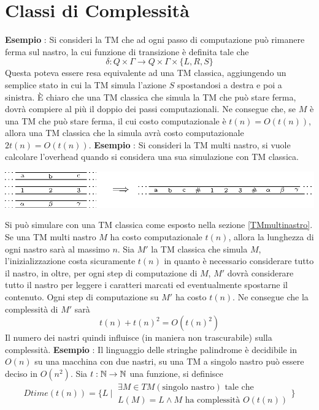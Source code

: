 \documentclass[10pt, letterpaper]{report}
\begin{document}
\section{Classi di Complessità}\label{classiComplessità}
\textbf{Esempio} : Si consideri la TM che ad ogni passo di computazione può rimanere ferma sul nastro, la cui funzione di transizione è definita tale che 
$$ \delta:Q\times\Gamma \rightarrow Q\times\Gamma\times \{L,R,S\}$$
Questa poteva essere resa equivalente ad una TM classica, aggiungendo un semplice stato in cui la TM simula l'azione $S$ spostandosi a destra e poi a sinistra. È chiaro che una TM classica che simula la TM che può stare ferma, dovrà compiere al più il doppio dei passi computazionali.\acc 
Ne consegue che, se $M$ è una TM che può stare ferma, il cui costo computazionale è $t(n)=O(t(n))$, allora una TM classica che la simula avrà costo computazionale $2t(n)=O(t(n))$.\acc 
\textbf{Esempio} : Si consideri la TM multi nastro, si vuole calcolare l'overhead quando si considera una sua simulazione con TM classica. \begin{center}
    \includegraphics[width=\textwidth ]{images/multinastro.eps}
\end{center}
Si può simulare con una TM classica come esposto nella sezione \ref{TMmultinastro}. Se una TM multi nastro $M$ ha costo computazionale $t(n)$, allora la lunghezza di ogni nastro sarà al massimo $n$. Sia $M'$ la TM classica che simula $M$, l'inizializzazione costa sicuramente $t(n)$ in quanto è necessario considerare tutto il nastro, in oltre, per ogni step di computazione di $M$, $M'$ dovrà considerare tutto il nastro per leggere i caratteri marcati ed eventualmente spostarne il contenuto. Ogni step di computazione su $M'$ ha costo $t(n)$. Ne consegue che la complessità di $M'$ sarà 
$$t(n)+t(n)^2 = O(t(n)^2)$$ Il numero dei nastri quindi influisce (in maniera non trascurabile) sulla complessità.\acc 
\textbf{Esempio} : Il linguaggio delle stringhe palindrome è decidibile in $O(n)$ su una macchina con due nastri, su una TM a singolo nastro può essere deciso in $O(n^2)$.\acc 
{}  Sia $t:{\mathbb N}\rightarrow {\mathbb N}$ una funzione, si definisce 
$$ Dtime(t(n))=\Bigg\{L \ |\ \begin{matrix}\exists M \in TM(\text{singolo nastro}) \text{ tale che }\\ L(M)=L\land M\text{ ha complessità }O(t(n))\end{matrix}\Bigg\}$$
\end{document}
